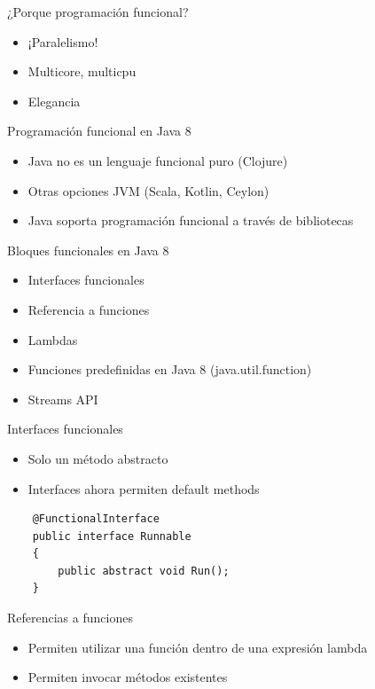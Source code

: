 \documentclass{beamer}
\begin{document}
\begin{frame}{¿Porque programación funcional?}
	\begin{itemize}
	\item ¡Paralelismo!
	\item Multicore, multicpu
	\item Elegancia
	\end{itemize}
\end{frame}

\begin{frame}{Programación funcional en Java 8}
	\begin{itemize}
	\item Java no es un lenguaje funcional puro (Clojure)
	\item Otras opciones JVM (Scala, Kotlin, Ceylon)
	\item Java soporta programación funcional a través de bibliotecas
	\end{itemize}
\end{frame}

\begin{frame}{Bloques funcionales en Java 8}
	\begin{itemize}
	\item Interfaces funcionales
	\item Referencia a funciones
	\item Lambdas
	\item Funciones predefinidas en Java 8 (java.util.function)
	\item Streams API
	\end{itemize}
\end{frame}

\begin{frame}[fragile]{Interfaces funcionales}
	\begin{itemize}
	\item Solo un método abstracto
	\item Interfaces ahora permiten default methods
	\end{itemize}
	\begin{lstlisting}
	@FunctionalInterface
	public interface Runnable
	{
		public abstract void Run();
	}
	\end{lstlisting}
\end{frame}

\begin{frame}{Referencias a funciones}
	\begin{itemize}
	\item Permiten utilizar una función dentro de una expresión lambda
	\item Permiten invocar métodos existentes
	\end{itemize}
\end{frame}
\end{document}
